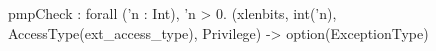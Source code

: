 pmpCheck : forall ('n : Int), 'n > 0.
  (xlenbits, int('n), AccessType(ext_access_type), Privilege) -> option(ExceptionType)